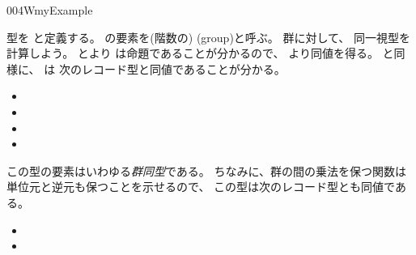 \documentclass[index]{subfiles}
\begin{document}
\begin{myBlock}{004W}{myExample}
\begin{itemize}
  \end{itemize}
  型を
  と定義する。
  の要素を(階数の)
  (group)と呼ぶ。
  群に対して、
  同一視型を計算しよう。
  とより
  は命題であることが分かるので、
  より同値を得る。
  と同様に、
  は
  次のレコード型と同値であることが分かる。
  \begin{itemize}
  \item {}
  \item {}
  \item {}
  \item {}
  \end{itemize}
  この型の要素はいわゆる\emph{群同型}である。
  ちなみに、群の間の乗法を保つ関数は単位元と逆元も保つことを示せるので、
  この型は次のレコード型とも同値である。
  \begin{itemize}
    \item {}
    \item {}
    \end{itemize}
  \end{myBlock}
\end{document}
